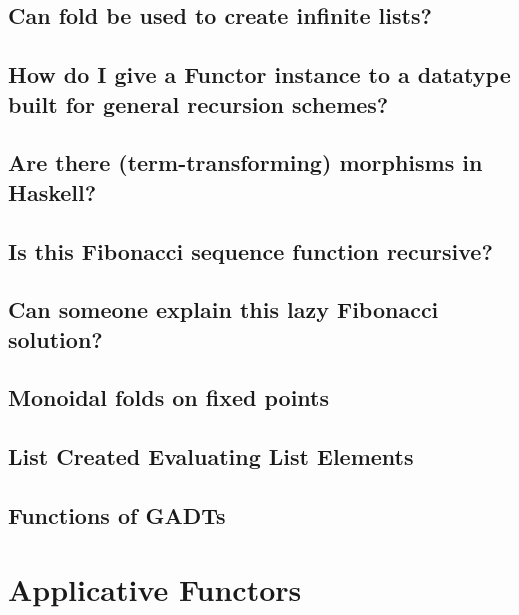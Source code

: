 \documentclass{book}%
\begin{document}
\section{Can fold be used to create infinite lists?}


\section{How do I give a Functor instance to a datatype built for general recursion schemes?}


\section{Are there (term-transforming) morphisms in Haskell?}


\section{Is this Fibonacci sequence function recursive?}


\section{Can someone explain this lazy Fibonacci solution?}


\section{Monoidal folds on fixed points}


\section{List Created Evaluating List Elements}


\section{Functions of GADTs}



\chapter{Applicative Functors}
\end{document}
